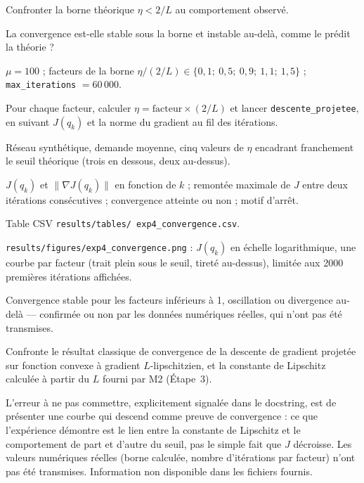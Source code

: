 \documentclass[11pt,a4paper]{article}
\begin{document}
\begin{description}[style=nextline]
  \item[Objectif] Confronter la borne théorique $\eta < 2/L$ au comportement
  observé.
  \item[Question scientifique] La convergence est-elle stable sous la borne
  et instable au-delà, comme le prédit la théorie ?
  \item[Paramètres contrôlés] $\mu = 100$ ; facteurs de la borne $\eta/(2/L)
  \in \{0{,}1;\ 0{,}5;\ 0{,}9;\ 1{,}1;\ 1{,}5\}$ ; \texttt{max\_iterations} $=
  60\,000$.
  \item[Méthode] Pour chaque facteur, calculer $\eta = \text{facteur}
  \times (2/L)$ et lancer \texttt{descente\_projetee}, en suivant $J(q_k)$ et
  la norme du gradient au fil des itérations.
  \item[Protocole expérimental] Réseau synthétique, demande moyenne, cinq
  valeurs de $\eta$ encadrant franchement le seuil théorique (trois en
  dessous, deux au-dessus).
  \item[Métriques] $J(q_k)$ et $\lVert \nabla J(q_k) \rVert$ en fonction de
  $k$ ; remontée maximale de $J$ entre deux itérations consécutives ;
  convergence atteinte ou non ; motif d'arrêt.
  \item[Sorties produites] Table CSV \texttt{results/tables/
  exp4\_convergence.csv}.
  \item[Figures] \texttt{results/figures/exp4\_convergence.png} : $J(q_k)$
  en échelle logarithmique, une courbe par facteur (trait plein sous le
  seuil, tireté au-dessus), limitée aux 2000 premières itérations affichées.
  \item[Interprétation attendue] Convergence stable pour les facteurs
  inférieurs à 1, oscillation ou divergence au-delà --- confirmée ou non par
  les données numériques réelles, qui n'ont pas été transmises.
  \item[Lien avec la théorie] Confronte le résultat classique de convergence
  de la descente de gradient projetée sur fonction convexe à gradient
  $L$-lipschitzien, et la constante de Lipschitz calculée à partir du $L$
  fourni par M2 (Étape~3).
  \item[Limites] L'erreur à ne pas commettre, explicitement signalée dans le
  docstring, est de présenter une courbe qui descend comme preuve de
  convergence : ce que l'expérience démontre est le lien entre la constante
  de Lipschitz et le comportement de part et d'autre du seuil, pas le simple
  fait que $J$ décroisse. Les valeurs numériques réelles (borne calculée,
  nombre d'itérations par facteur) n'ont pas été transmises. Information non
  disponible dans les fichiers fournis.
\end{description}
\end{document}
